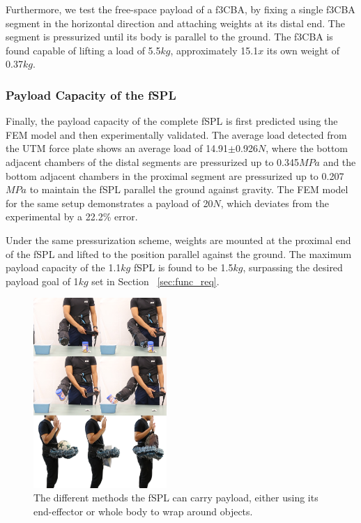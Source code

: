 \documentclass[letterpaper, 10 pt, conference]{ieeeconf}  %
\begin{document}
Furthermore, we test the free-space payload of a f3CBA, by fixing a single f3CBA segment in the horizontal direction and attaching weights at its distal end. The segment is pressurized until its body is parallel to the ground. The f3CBA is found capable of lifting a load of 5.5$kg$, approximately 15.1$x$ its own weight of 0.37$kg$.


\subsubsection{Payload Capacity of the fSPL}

Finally, the payload capacity of the complete fSPL is first predicted using the FEM model and then experimentally validated. The average load detected from the UTM force plate shows an average load of 14.91$\pm$0.926$N$, where the bottom adjacent chambers of the distal segments are pressurized up to 0.345$MPa$ and the bottom adjacent chambers in the proximal segment are pressurized up to 0.207$MPa$ to maintain the fSPL parallel the ground against gravity. The FEM model for the same setup demonstrates a payload of 20$N$, which deviates from the experimental by a 22.2\% error. 
% 
% 

Under the same pressurization scheme, weights are mounted at the proximal end of the fSPL and lifted to the position parallel against the ground. The maximum payload capacity of the 1.1$kg$ fSPL is found to be 1.5$kg$, surpassing the desired payload goal of 1$kg$ set in Section ~\ref{sec:func_req}.
% 
% 


\begin{figure}[b!]
\centering
\includegraphics[width=0.45\textwidth]{Figures/pick_place_whole_body}
\caption{The different methods the fSPL can carry payload, either using its end-effector or whole body to wrap around objects.}
\label{fig:pick_place_whole_body}
\vspace{-1.5em}
\end{figure}
\end{document}
